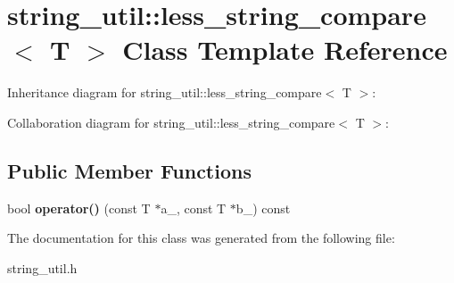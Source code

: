 \section{string\+\_\+util\+:\+:less\+\_\+string\+\_\+compare$<$ T $>$ Class Template Reference}
\label{classstring__util_1_1less__string__compare}


Inheritance diagram for string\+\_\+util\+:\+:less\+\_\+string\+\_\+compare$<$ T $>$\+:


Collaboration diagram for string\+\_\+util\+:\+:less\+\_\+string\+\_\+compare$<$ T $>$\+:
\subsection*{Public Member Functions}
\begin{DoxyCompactItemize}
\item 
bool {\bfseries operator()} (const T $\ast$a\+\_\+, const T $\ast$b\+\_\+) const \label{classstring__util_1_1less__string__compare_aa97df82edd8f7e33e5715acf71759337}

\end{DoxyCompactItemize}


The documentation for this class was generated from the following file\+:\begin{DoxyCompactItemize}
\item 
string\+\_\+util.\+h\end{DoxyCompactItemize}
